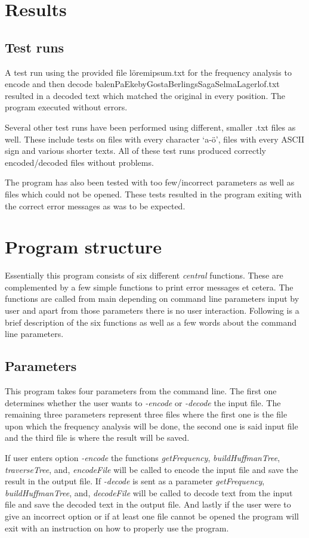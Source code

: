 \documentclass[a4paper,11pt,twoside]{article}
\begin{document}
\section{Results}
\subsection{Test runs}
A test run using the provided file löremipsum.txt for the frequency analysis to encode and then decode balenPaEkebyGostaBerlingsSagaSelmaLagerlof.txt resulted in a decoded text which matched the original in every position. The program executed without errors. 

Several other test runs have been performed using different, smaller .txt files as well. These include tests on files with every character `a-ö', files with every ASCII sign and various shorter texts. All of these test runs produced correctly encoded/decoded files without problems.

The program has also been tested with too few/incorrect parameters as well as files which could not be opened. These tests resulted in the program exiting with the correct error messages as was to be expected. 

\section{Program structure}
Essentially this program consists of six different \emph{central} functions. These are complemented by a few simple functions to print error messages et cetera. The functions are called from main depending on command line parameters input by user and apart from those parameters there is no user interaction. Following is a brief description of the six functions as well as a few words about the command line parameters.
\subsection{Parameters}
This program takes four parameters from the command line. The first one determines whether the 
user wants to \emph{-encode} or \emph{-decode} the input file. The remaining three parameters represent 
three files where the first one is the file upon which the frequency analysis will be done, the second one is said 
input file and the third file is where the result will be saved. 

If user enters option \emph{-encode} the functions \emph{getFrequency}, \emph{buildHuffmanTree}, \emph{traverseTree}, and, \emph{encodeFile} will be called to encode the input file and save the result in the output file. If \emph{-decode} is sent as a parameter \emph{getFrequency}, \emph{buildHuffmanTree}, and, \emph{decodeFile} will be called to decode text from the input file and save the decoded text in the output file. And lastly if the user were to give an incorrect option or if at least one file cannot be opened the program will exit with an instruction on how to properly use the program.
\end{document}
